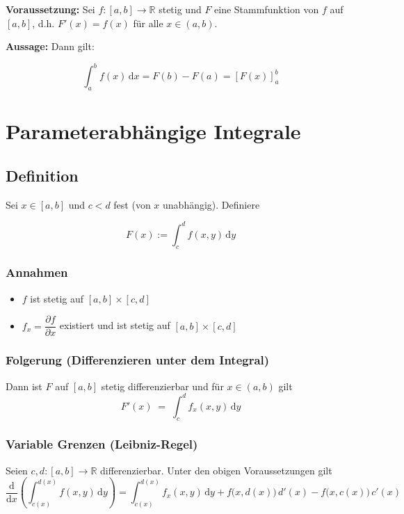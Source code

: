 \documentclass[a4paper,11pt,oneside,open=any,parskip=half, DIV=15]{scrreprt}
\begin{document}
         \textbf{Voraussetzung:} Sei \(f:[a,b] \to \mathbb{R}\) stetig und \(F\) eine Stammfunktion von \(f\) auf \([a,b]\), d.h. \(F'(x) = f(x)\) für alle \(x \in (a,b)\).

         \textbf{Aussage:} Dann gilt:
         \begin{importantbox}
         \[
            \int_{a}^{b} f(x) \, \mathrm{d}x = F(b) - F(a) = \left[ F(x) \right]_{a}^{b}
         \]
         \end{importantbox}

\section{Parameterabhängige Integrale}

   \subsection*{Definition}
   Sei \(x\in[a,b]\) und \(c<d\) fest (von \(x\) unabhängig). Definiere
   \begin{importantbox}
   \[
      F(x) := \int_{c}^{d} f(x,y)\,\mathrm{d}y
   \]
   \end{importantbox}

   \subsubsection*{Annahmen}
      \begin{importantbox}
         \begin{itemize}
            \item \(f\) ist stetig auf \([a,b]\times[c,d]\)
            \item \(f_x=\dfrac{\partial f}{\partial x}\) existiert und ist stetig auf \([a,b]\times[c,d]\)
         \end{itemize}
      \end{importantbox}

      \subsubsection*{Folgerung (Differenzieren unter dem Integral)}
         Dann ist \(F\) auf \([a,b]\) stetig differenzierbar und für \(x\in(a,b)\) gilt
         \[
            F'(x) \;=\; \int_{c}^{d} f_x(x,y)\,\mathrm{d}y
         \]

   \subsubsection*{Variable Grenzen (Leibniz-Regel)}
      Seien \(c,d:[a,b]\to\mathbb{R}\) differenzierbar. Unter den obigen Voraussetzungen gilt
      \[
         \frac{\mathrm{d}}{\mathrm{d}x}\!\left(\int_{c(x)}^{d(x)} f(x,y)\,\mathrm{d}y\right)
         = \int_{c(x)}^{d(x)} f_x(x,y)\,\mathrm{d}y
            + f\bigl(x,d(x)\bigr)\,d'(x) - f\bigl(x,c(x)\bigr)\,c'(x)
      \]
\newpage
\end{document}
